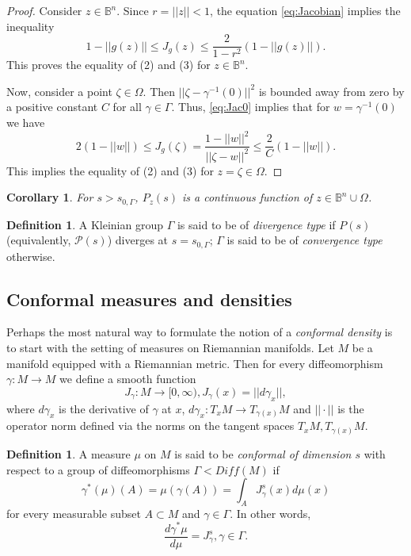 \documentclass[12pt]{amsbook}%
\newtheorem{cor}[thm]{Corollary}
\theoremstyle{definition}
\newtheorem{defi}[thm]{Definition}
\theoremstyle{remark}
\numberwithin{section}{chapter}
\numberwithin{subsection}{section}
\numberwithin{figure}{chapter}
\def\cP{{\mathscr{P}}}
\def\Ga{\Gamma}
\def\ga{\gamma}
\def\Om{\Omega}
\begin{document}
{{\begin{proof}
Consider $z\in \mathbb B^n$. Since $r=||z||<1$, the equation \eqref{eq:Jacobian} implies the inequality 
$$
1-||g(z)|| \leqslant J_g(z)\leqslant \frac{2}{1-r^2}(1-||g(z)||). 
$$
This proves the equality of (2) and (3) for $z\in \mathbb B^n$. 

Now, consider a point $\zeta\in \Omega$. Then $||\zeta-\gamma^{-1}(0)||^2$ is bounded away from zero by a positive 
constant $C$ for all $\ga\in \Ga$. Thus, \eqref{eq:Jac0} implies that for $w=\ga^{-1}(0)$ we have 
$$
2(1-||w||) \le J_g(\zeta)= \frac{1-||w||^2}{||\zeta-w||^2}\leqslant \frac{2}{C}(1-||w||). 
$$
This implies the equality of (2) and (3) for $z=\zeta\in \Omega$. 
\end{proof}


\begin{cor}
For $s> s_{0,\Ga}$, $P_z(s)$ is a continuous function of $z\in \mathbb B^n \cup \Om$.  
\end{cor} 

\begin{defi}
A Kleinian group $\Ga$ is said to be of {\em divergence type} if $P(s)$ (equivalently, $\cP(s)$) diverges at $s=s_{0,\Ga}$; $\Ga$ is said to be of {\em convergence type} otherwise.  
\end{defi}



\subsection{Conformal measures and densities}\label{sec:Conformal measures}




Perhaps the most natural way to formulate the notion of a {\em conformal density} is to start with the setting of measures on Riemannian manifolds. Let $M$ be a manifold equipped with a Riemannian metric. Then for every diffeomorphism 
$\gamma: M\to M$ we define a smooth function 
$$
J_\ga: M\to [0,\infty), J_\ga(x)=||d\ga_x||,
$$
where $d\ga_x$ is the derivative of $\ga$ at $x$, $d\ga_x: T_xM\to T_{\ga(x)}M$ and $||\cdot||$ is the operator norm defined via the norms on the tangent spaces $T_xM, T_{\ga(x)}M$. 
\begin{defi}\label{def:conformal_density_1}
A measure $\mu$ on $M$ is said to be {\em conformal of dimension $s$} with respect to a group of diffeomorphisms $\Ga< Diff(M)$ if 
\begin{equation}\label{eq:conformal1}
\gamma^*(\mu)(A)=\mu(\gamma(A))= \int_A J^s_\gamma(x) d\mu(x) 
\end{equation}
for every measurable subset $A\subset M$ and $\gamma\in\Gamma$.  In other words,
$$
\frac{d\ga^*\mu}{d\mu}= J^s_\gamma, \gamma\in \Gamma. 
$$
\end{defi}

}}
\end{document}
